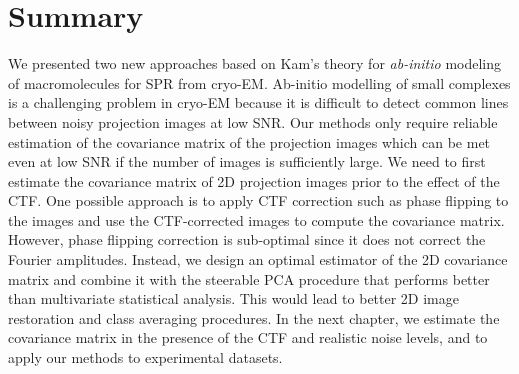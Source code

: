 \section{Summary}
We presented two new approaches based on Kam's theory for {\em ab-initio} modeling of macromolecules for SPR from cryo-EM.  
Ab-initio modelling of small complexes is a challenging problem in cryo-EM because it is difficult to detect common lines between noisy projection images at low SNR. 
Our methods only require reliable estimation of the covariance matrix of the projection images which can be met even at low SNR if the number of images is sufficiently large. We need to first estimate the covariance matrix of 2D projection images prior to the effect of the CTF. One possible approach is to apply CTF correction such as phase flipping to the images and use the CTF-corrected images to compute the covariance matrix. However, phase  flipping correction is sub-optimal since it does not correct the Fourier amplitudes. Instead, we design an optimal estimator of the 2D covariance matrix and combine it with the steerable PCA \cite{Zhao1, Zhao2016} procedure that performs better than multivariate statistical analysis. This would lead to better 2D image restoration and class averaging procedures. In the next chapter, we estimate the covariance matrix in the presence of the CTF and realistic noise levels, and to apply our methods to experimental datasets.


%




